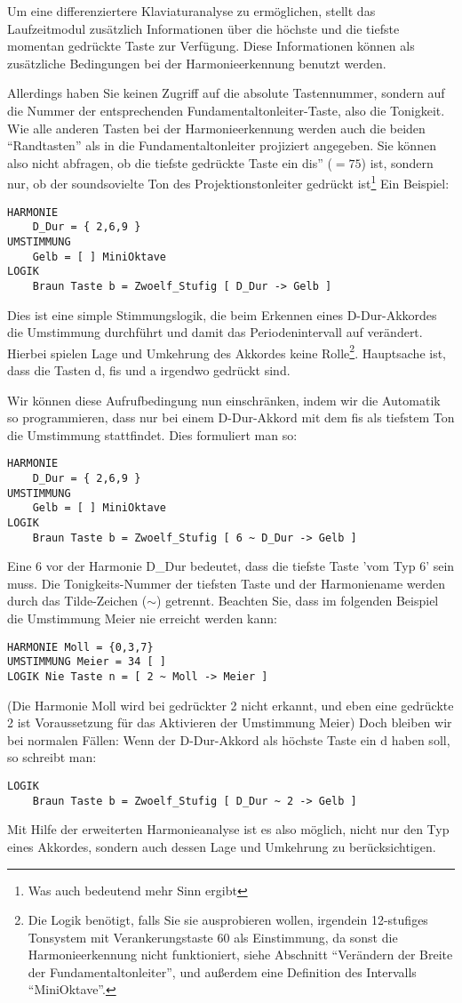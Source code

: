 Um eine differenziertere Klaviaturanalyse zu er\-mög\-li\-chen, stellt
das Lauf\-zeit\-mo\-dul zusätzlich Informationen über die höchste und
die tiefste momentan gedrückte Taste zur Verfügung. Diese
Informationen können als zusätzliche Bedingungen bei der
Harmonieerkennung benutzt werden.

Allerdings haben Sie keinen Zugriff auf die absolute Tastennummer,
sondern auf die Nummer der entsprechenden Fundamentaltonleiter-Taste, also die Tonigkeit. Wie alle
anderen Tasten bei der Harmonieerkennung werden auch die beiden
"`Randtasten"' als in die Fundamentaltonleiter projiziert angegeben. Sie können also
nicht abfragen, ob die tiefste gedrückte Taste ein dis'' ($=75$)
ist, sondern nur, ob der soundsovielte Ton des Projektionstonleiter
gedrückt ist\footnote{Was auch bedeutend mehr Sinn ergibt}
Ein Beispiel:
\begin{verbatim}
HARMONIE
    D_Dur = { 2,6,9 }
UMSTIMMUNG
    Gelb = [ ] MiniOktave
LOGIK
    Braun Taste b = Zwoelf_Stufig [ D_Dur -> Gelb ]
\end{verbatim}
Dies ist eine simple Stimmungslogik, die beim Erkennen eines 
D-Dur-Akkordes die Umstimmung  durchführt und damit das
Periodenintervall auf  verändert. Hierbei spielen Lage
und Umkehrung des Akkordes keine Rolle\footnote{Die Logik benötigt,
falls Sie sie ausprobieren wollen, irgendein 12-stufiges Tonsystem
mit Verankerungstaste 60 als Einstimmung, da sonst die Harmonieerkennung nicht
funktioniert, siehe Abschnitt "`Verändern der Breite der Fundamentaltonleiter"', und
außerdem eine Definition des Intervalls "`MiniOktave"'.}. Hauptsache
ist, dass die Tasten d, fis und a irgendwo gedrückt sind.

Wir können diese Aufrufbedingung nun einschränken, indem wir die
Automatik so programmieren, dass nur bei einem D-Dur-Akkord mit dem
fis als tiefstem Ton die Umstimmung stattfindet. Dies formuliert
man so:
\begin{verbatim}
HARMONIE
    D_Dur = { 2,6,9 }
UMSTIMMUNG
    Gelb = [ ] MiniOktave
LOGIK
    Braun Taste b = Zwoelf_Stufig [ 6 ~ D_Dur -> Gelb ]
\end{verbatim}
Eine 6 vor der Harmonie D\_Dur bedeutet, dass die tiefste Taste 'vom
Typ 6' sein muss. Die Tonigkeits-Nummer der tiefsten Taste und der
Harmoniename werden durch das Tilde-Zeichen ($\sim$) getrennt.
Beachten Sie, dass im folgenden Beispiel die Umstimmung Meier nie
erreicht werden kann:
\begin{verbatim}
HARMONIE Moll = {0,3,7}
UMSTIMMUNG Meier = 34 [ ]
LOGIK Nie Taste n = [ 2 ~ Moll -> Meier ]
\end{verbatim}
(Die Harmonie Moll wird bei gedrückter 2 nicht erkannt, und eben
eine gedrückte 2 ist Voraussetzung für das Aktivieren der
Umstimmung Meier)
Doch bleiben wir bei normalen Fällen:
Wenn der D-Dur-Akkord als höchste Taste ein d haben soll, so
schreibt man:
\begin{verbatim}
LOGIK
    Braun Taste b = Zwoelf_Stufig [ D_Dur ~ 2 -> Gelb ]
\end{verbatim}
Mit Hilfe der erweiterten Harmonieanalyse ist es also möglich,
nicht nur den Typ eines Akkordes, sondern auch dessen Lage und
Umkehrung zu berücksichtigen.

